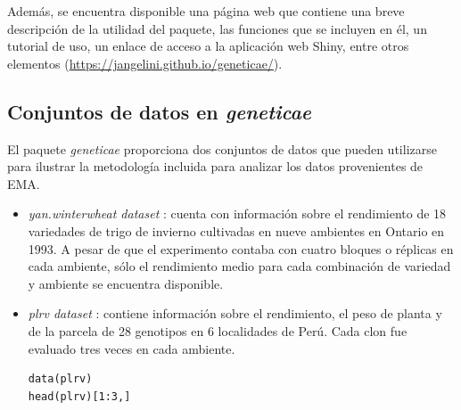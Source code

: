 Además, se encuentra disponible una página web que contiene una breve descripción de la utilidad del paquete, las funciones que se incluyen en él, un tutorial de uso, un enlace de acceso a la aplicación web Shiny, entre otros elementos (\url{https://jangelini.github.io/geneticae/}).


\subsection{Conjuntos de datos en \emph{geneticae}}
\label{subsec:datosejemplos}
El paquete \emph{geneticae} proporciona dos conjuntos de datos que pueden utilizarse para ilustrar la metodología incluida para analizar los datos provenientes de EMA. 

\begin{itemize}[wide, nosep, labelindent = 0pt, topsep = 1ex, noitemsep,topsep=0pt]
\item \emph{yan.winterwheat dataset} \citep{Wright2020}: cuenta con información sobre el rendimiento de 18 variedades de trigo de invierno cultivadas en nueve ambientes en Ontario en 1993. A pesar de que el experimento contaba con cuatro bloques o réplicas en cada ambiente, sólo el rendimiento medio para cada combinación de variedad y ambiente se encuentra disponible.\\


\item \emph{plrv dataset} \citep{deMendiburu2020}: contiene información sobre el rendimiento, el peso de planta y de la parcela de 28 genotipos en 6 localidades de Perú. Cada clon fue evaluado tres veces en cada ambiente. \\

\begin{tcolorbox}[skin=bicolor,
    colframe=aurometalsaurus,colback=backcolour,colbacklower=white,
    width=1\linewidth,
    height=0.24\linewidth,
    boxsep=-3mm]
\begin{lstlisting}
data(plrv)
head(plrv)[1:3,]
\end{lstlisting}


\end{tcolorbox}
\end{itemize}
